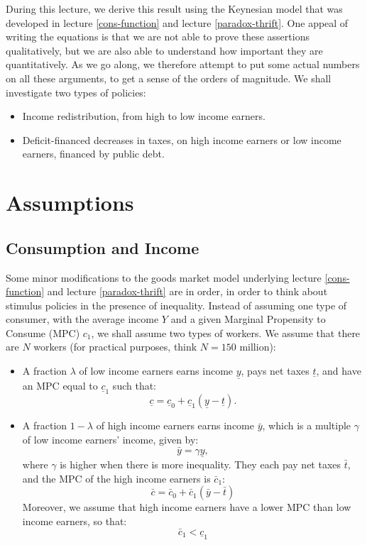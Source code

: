 \documentclass[]{book}
\begin{document}
During this lecture, we derive this result using the Keynesian model
that was developed in lecture \ref{cons-function} and lecture
\ref{paradox-thrift}. One appeal of writing the equations is that we are
not able to prove these assertions qualitatively, but we are also able
to understand how important they are quantitatively. As we go along, we
therefore attempt to put some actual numbers on all these arguments, to
get a sense of the orders of magnitude. We shall investigate two types
of policies:

\begin{itemize}
\item
  Income redistribution, from high to low income earners.
\item
  Deficit-financed decreases in taxes, on high income earners or low
  income earners, financed by public debt.
\end{itemize}

\section{Assumptions}\label{assumptions-3}

\subsection{Consumption and Income}\label{consumption-and-income}

Some minor modifications to the goods market model underlying lecture
\ref{cons-function} and lecture \ref{paradox-thrift} are in order, in
order to think about stimulus policies in the presence of inequality.
Instead of assuming one type of consumer, with the average income \(Y\)
and a given Marginal Propensity to Consume (MPC) \(c_{1}\), we shall
assume two types of workers. We assume that there are \(N\) workers (for
practical purposes, think \(N=150\) million):

\begin{itemize}
\item
  A fraction \(\lambda\) of low income earners earns income
  \(\underline{y}\), pays net taxes \(\underline{t}\), and have an MPC
  equal to \(\underline{c}_{1}\) such that:
  \[\underline{c}=\underline{c}_{0}+\underline{c}_{1}(\underline{y}-\underline{t}).\]
\item
  A fraction \(1-\lambda\) of high income earners earns income
  \(\bar{y}\), which is a multiple \(\gamma\) of low income earners'
  income, given by: \[\bar{y}=\gamma\underline{y},\] where \(\gamma\) is
  higher when there is more inequality. They each pay net taxes
  \(\bar{t}\), and the MPC of the high income earners is
  \(\bar{c}_{1}\): \[\bar{c}=\bar{c}_{0}+\bar{c}_{1}(\bar{y}-\bar{t})\]
  Moreover, we assume that high income earners have a lower MPC than low
  income earners, so that: \[\bar{c}_{1}<\underline{c}_{1}\]
\end{itemize}
\end{document}
